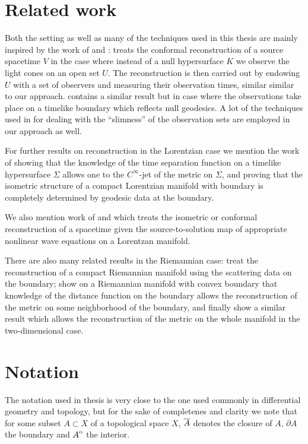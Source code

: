 \section{Related work}
Both the setting as well as many of the techniques used in this thesis are mainly inspired by the work of \citet{kurylev2017inverse} and \citet{hintzpaper}:
\cite{kurylev2017inverse} treats the conformal reconstruction of a source spacetime $V$ in the case where instead of a null hypersurface $K$ we observe the light cones on an open set $U$. The reconstruction is then carried out by endowing $U$ with a set of observers and measuring their observation times, similar similar to our approach. \cite{hintzpaper} contains a similar result but in case where the observations take place on a timelike boundary which reflects null geodesics. A lot of the techniques used in \cite{hintzpaper} for dealing with the \enquote{slimness} of the observation sets are employed in our approach as well.

For further results on reconstruction in the Lorentzian case we mention the work of \citet{lassas2016determination} showing that the knowledge of the time separation function on a timelike hypersurface $\Sigma$ allows one to the $C^\infty$-jet of the metric on $\Sigma$, and \citet{larsson2015broken} proving that the isometric structure of a compact Lorentzian manifold with boundary is completely determined by geodesic data at the boundary.

We also mention work of \citet{wang2019inverse} and \citet{lassas2018inverse} which treats the isometric or conformal reconstruction of a spacetime given the source-to-solution map of appropriate nonlinear wave equations on a Lorentzan manifold.

There are also many related results in the Riemannian case: \citet{lassas2017reconstruction} treat the reconstruction of a compact Riemannian manifold using the scattering data on the boundary; \citet{stefanov2017local} show on a Riemannian manifold with convex boundary that knowledge of the distance function on the boundary allows the reconstruction of the metric on some neighborhood of the boundary, and finally \citet{pestov2005two} show a similar result which allows the reconstruction of the metric on the whole manifold in the two-dimensional case.

\section{Notation}
The notation used in thesis is very close to the one used commonly in differential geometry and topology, but for the sake of completenes and clarity we note that for some subset $A\subset X$ of a topological space $X$, ${\overline{A}}$ denotes the closure of $A$, $\partial A$ the boundary and ${\kern0ptA}^{\mathrm{o}}$ the interior. 

